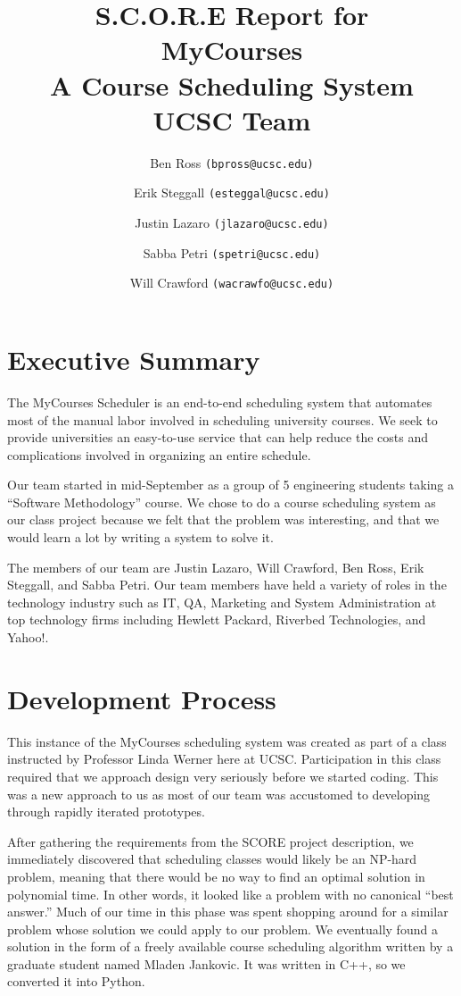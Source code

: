 \documentclass[12pt]{article}
\title{S.C.O.R.E Report for\\ MyCourses \\ A Course Scheduling System \\ UCSC Team}
\author{Ben Ross \texttt{(bpross@ucsc.edu)} \\
	\and Erik Steggall \texttt{(esteggal@ucsc.edu)}\\
	\and Justin Lazaro \texttt{(jlazaro@ucsc.edu)}\\
	\and Sabba Petri \texttt{(spetri@ucsc.edu)}\\
	\and Will Crawford \texttt{(wacrawfo@ucsc.edu)}}
\date{}
\begin{document}
\maketitle
\pagebreak
\tableofcontents
\pagebreak

\section{Executive Summary}
The MyCourses Scheduler is an end-to-end scheduling system that automates most of the manual labor involved in scheduling university courses. We seek to provide universities an easy-to-use service that can help reduce the costs and complications involved in organizing an entire schedule.


Our team started in mid-September as a group of 5 engineering students taking a ``Software Methodology'' course. We chose to do a course scheduling system as our class project because we felt that the problem was interesting, and that we would learn a lot by writing a system to solve it.

The members of our team are Justin Lazaro, Will Crawford, Ben Ross, Erik Steggall, and Sabba Petri. Our team members have held a variety of roles in the technology industry such as IT, QA, Marketing and System Administration at top technology firms including Hewlett Packard, Riverbed Technologies, and Yahoo!. 


\section{Development Process} %
\indent This instance of the MyCourses scheduling system was created as part of a class instructed by Professor Linda Werner here at UCSC. Participation in this class required that we approach design very seriously before we started coding. This was a new approach to us as most of our team was accustomed to developing through rapidly iterated prototypes.

After gathering the requirements from the SCORE project description, we immediately discovered that scheduling classes would likely be an NP-hard problem, meaning that there would be no way to find an optimal solution in polynomial time. In other words, it looked like a problem with no canonical ``best answer.'' Much of our time in this phase was spent shopping around for a similar problem whose solution we could apply to our problem. We eventually found a solution in the form of a freely available course scheduling algorithm written by a graduate student named Mladen Jankovic. It was written in C++, so we converted it into Python.
\end{document}
